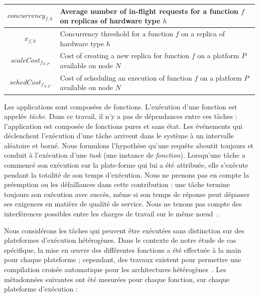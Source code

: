 \begin{table}[t]
\begin{center}
\begin{tabular}{|c|L|}
    $concurrency_{f, h}$ & Average number of in-flight requests for a function $f$ on replicas of hardware type $h$ \\ \hline
    $x_{f, h}$ & Concurrency threshold for a function $f$ on a replica of hardware type $h$ \\ \hline
    $scaleCost_{{f}_{N, P}}$ & Cost of creating a new replica for function $f$ on a platform $P$ available on node $N$ \\ \hline
    $schedCost_{{f}_{N, P}}$ & Cost of scheduling an execution of function $f$ on a platform $P$ available on node $N$ \\ \hline
    \end{tabular}
    \label{table:herofake-notation}
    \end{center}
\end{table}

Les applications sont composées de fonctions. L'exécution d'une fonction est appelée \textit{tâche}. Dans ce travail, il n'y a pas de dépendances entre ces tâches : l'application est composée de fonctions pures et sans état. Les événements qui déclenchent l'exécution d'une tâche arrivent dans le système à un intervalle aléatoire et borné. Nous formulons l'hypothèse qu'une requête aboutit toujours et conduit à l'exécution d'une \textit{task} (une instance de \textit{fonction}). Lorsqu'une tâche a commencé son exécution sur la plate-forme qui lui a été attribuée, elle s'exécute pendant la totalité de son temps d'exécution. Nous ne prenons pas en compte la préemption ou les défaillances dans cette contribution : une tâche termine toujours son exécution avec succès, même si son temps de réponse peut dépasser ses exigences en matière de qualité de service. Nous ne tenons pas compte des interférences possibles entre les charges de travail sur le même nœud~\cite{dartoisInvestigatingMachineLearning2021}. 

Nous considérons les tâches qui peuvent être exécutées sans distinction sur des plateformes d'exécution hétérogènes. Dans le contexte de notre étude de cas spécifique, la mise en œuvre des différentes fonctions a été effectuée à la main pour chaque plateforme ; cependant, des travaux existent pour permettre une compilation croisée automatique pour les architectures hétérogènes~\cite{hortaXartrekRuntimeExecution2021, 10.1145/3445814.3446699}. Les métadonnées suivantes ont été mesurées pour chaque fonction, sur chaque plateforme d'exécution : 

